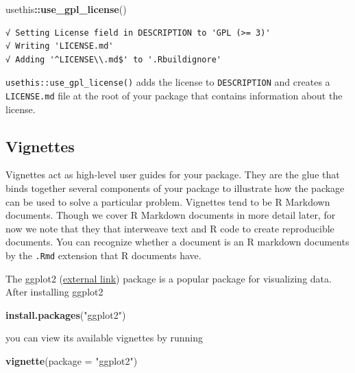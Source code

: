 \documentclass[
]{book}
\newenvironment{Shaded}{\begin{snugshade}}{\end{snugshade}}
\newcommand{\DataTypeTok}[1]{\textcolor[rgb]{0.13,0.29,0.53}{#1}}
\newcommand{\KeywordTok}[1]{\textcolor[rgb]{0.13,0.29,0.53}{\textbf{#1}}}
\newcommand{\NormalTok}[1]{#1}
\newcommand{\OperatorTok}[1]{\textcolor[rgb]{0.81,0.36,0.00}{\textbf{#1}}}
\newcommand{\StringTok}[1]{\textcolor[rgb]{0.31,0.60,0.02}{#1}}
\begin{document}
\begin{Shaded}
\begin{Highlighting}[]
\NormalTok{usethis}\OperatorTok{::}\KeywordTok{use_gpl_license}\NormalTok{()}
\end{Highlighting}
\end{Shaded}

\begin{verbatim}
√ Setting License field in DESCRIPTION to 'GPL (>= 3)'
√ Writing 'LICENSE.md'
√ Adding '^LICENSE\\.md$' to '.Rbuildignore'
\end{verbatim}

\texttt{usethis::use\_gpl\_license()} adds the license to \texttt{DESCRIPTION} and creates a \texttt{LICENSE.md} file at the root of your package that contains information about the license.

\hypertarget{vignettes}{%
\subsection{Vignettes}\label{vignettes}}

Vignettes act as high-level user guides for your package. They are the glue that binds together several components of your package to illustrate how the package can be used to solve a particular problem. Vignettes tend to be R Markdown documents. Though we cover R Markdown documents in more detail later, for now we note that they that interweave text and R code to create reproducible documents. You can recognize whether a document is an R markdown documents by the \texttt{.Rmd} extension that R documents have.

The ggplot2 (\href{https://ggplot2.tidyverse.org/}{external link}) package is a popular package for visualizing data. After installing ggplot2

\begin{Shaded}
\begin{Highlighting}[]
\KeywordTok{install.packages}\NormalTok{(}\StringTok{"ggplot2"}\NormalTok{)}
\end{Highlighting}
\end{Shaded}

you can view its available vignettes by running

\begin{Shaded}
\begin{Highlighting}[]
\KeywordTok{vignette}\NormalTok{(}\DataTypeTok{package =} \StringTok{"ggplot2"}\NormalTok{)}
\end{Highlighting}
\end{Shaded}
\end{document}
